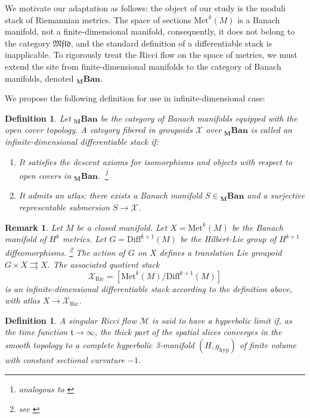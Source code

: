 \documentclass[11pt]{article}
\newtheorem{definition}[theorem]{Definition}
\newtheorem{remark}[theorem]{Remark}
\newcommand{\Met}{\mathrm{Met}}
\newcommand{\Diff}{\mathrm{Diff}}
\begin{document}
We motivate our adaptation as follows: the object of our study is the moduli stack of Riemannian metrics. The space of sections $\Met^k(M)$ is a Banach manifold, not a finite-dimensional manifold, consequently, it does not belong to the category $\mathfrak{Mfld}$, and the standard definition of a differentiable stack is inapplicable. To rigorously treat the Ricci flow on the space of metrics, we must extend the site from finite-dimensional manifolds to the category of Banach manifolds, denoted $\mathbf{_M Ban}$.

We propose the following definition for use in infinite-dimensional case:

\begin{definition}
Let $\mathbf{_M Ban}$ be the category of Banach manifolds equipped with the open cover topology. A category fibered in groupoids $\mathcal{X}$ over $\mathbf{_M Ban}$ is called an infinite-dimensional differentiable stack if:
\begin{enumerate}
    \item It satisfies the descent axioms for isomorphisms and objects with respect to open covers in $\mathbf{_M Ban}$. \,\footnote{analogous to \cite[Definition 2.2]{Blo08} }
    \item It admits an atlas: there exists a Banach manifold $S \in \mathbf{_M Ban}$ and a surjective representable submersion $S \longrightarrow \mathcal{X}$.
\end{enumerate}
\end{definition}
\begin{remark}
Let $M$ be a closed manifold. Let $X = \Met^k(M)$ be the Banach manifold of $H^k$ metrics. Let $G = \Diff^{k+1}(M)$ be the Hilbert-Lie group of $H^{k+1}$ diffeomorphisms. \footnote{see \cite[Theorem 43.1]{KM97} }
The action of $G$ on $X$ defines a translation Lie groupoid $G \times X \rightrightarrows X$. The associated quotient stack
\[ \mathcal{X}_{\mathrm{Ric}} = [\Met^k(M) / \Diff^{k+1}(M)] \]
is an infinite-dimensional differentiable stack according to the definition above, with atlas $X \longrightarrow\mathcal{X}_{\mathrm{Ric}}$.
\end{remark}
\begin{definition}
A singular Ricci flow $\mathcal{M}$ is said to have a hyperbolic limit if, as the time function $\mathfrak{t} \to \infty$, the thick part of the spatial slices converges in the smooth topology to a complete hyperbolic 3-manifold $(H, g_{\mathrm{hyp}})$ of finite volume with constant sectional curvature $-1$.
\end{definition}
\end{document}
